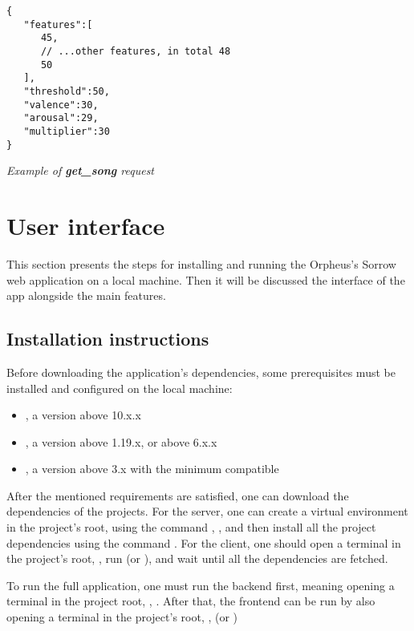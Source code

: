 \begin{listing}[h]
  \centering
  \begin{verbatim}
{
   "features":[
      45, 
      // ...other features, in total 48
      50
   ],
   "threshold":50,
   "valence":30,
   "arousal":29,
   "multiplier":30
}
  \end{verbatim}
  \caption{\emph{Example of \textbf{{get\_song}} request}}
  \label{lst:dumb}
\end{listing}

\section{User interface}

This section presents the steps for installing and running the Orpheus's Sorrow
web application on a local machine.
Then it will be discussed the interface of the app alongside the main features.

\subsection{Installation instructions}

Before downloading the application's dependencies,
some prerequisites must be installed and configured on the local machine:
\begin{itemize}
  \item {}, a version above 10.x.x
  \item {}, a version above 1.19.x, or  above 6.x.x
  \item {}, a version above 3.x with the minimum compatible 
\end{itemize}

After the mentioned requirements are satisfied,
one can download the dependencies of the projects.
For the server, one can create a virtual environment in the project's root,
using the command , ,
and then install all the project dependencies using
the command .
For the client, one should open a terminal in the project's root,
, run  (or ),
and wait until all the dependencies are fetched.

To run the full application,
one must run the backend first,
meaning opening a terminal in the project root, ,
.
After that, the frontend can be run by also opening a terminal in the project's root,
,  (or )

